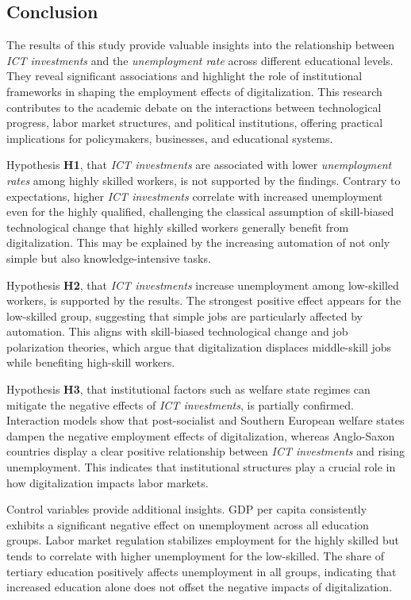 
\subsection{Conclusion}

The results of this study provide valuable insights into the relationship between 
\textit{ICT investments} and the \textit{unemployment rate} across different educational 
levels. They reveal significant associations and highlight the role of institutional 
frameworks in shaping the employment effects of digitalization. This research contributes 
to the academic debate on the interactions between technological progress, labor market 
structures, and political institutions, offering practical implications for policymakers, 
businesses, and educational systems.

Hypothesis \textbf{H1}, that \textit{ICT investments} are associated with lower 
\textit{unemployment rates} among highly skilled workers, is not supported by the findings. 
Contrary to expectations, higher \textit{ICT investments} correlate with increased 
unemployment even for the highly qualified, challenging the classical assumption of 
skill-biased technological change that highly skilled workers generally benefit from digitalization. 
This may be explained by the increasing automation of not only simple but also knowledge-intensive 
tasks.

Hypothesis \textbf{H2}, that \textit{ICT investments} increase unemployment among 
low-skilled workers, is supported by the results. The strongest positive effect appears 
for the low-skilled group, suggesting that simple jobs are particularly affected by automation. 
This aligns with skill-biased technological change and job polarization theories, which argue that 
digitalization displaces middle-skill jobs while benefiting high-skill workers.

Hypothesis \textbf{H3}, that institutional factors such as welfare state regimes can mitigate 
the negative effects of \textit{ICT investments}, is partially confirmed. Interaction models 
show that post-socialist and Southern European welfare states dampen the negative employment 
effects of digitalization, whereas Anglo-Saxon countries display a clear positive relationship 
between \textit{ICT investments} and rising unemployment. This indicates that institutional 
structures play a crucial role in how digitalization impacts labor markets.

Control variables provide additional insights. GDP per capita consistently exhibits a 
significant negative effect on unemployment across all education groups. Labor market 
regulation stabilizes employment for the highly skilled but tends to correlate with higher 
unemployment for the low-skilled. The share of tertiary education positively affects 
unemployment in all groups, indicating that increased education alone does not offset 
the negative impacts of digitalization.

